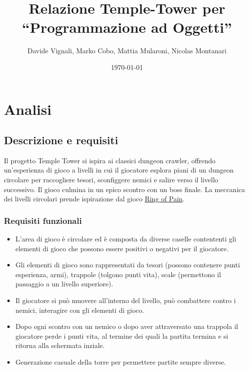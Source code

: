 \documentclass[a4paper,12pt]{report}
\title{Relazione Temple-Tower per\\``Programmazione ad Oggetti''}
\author{Davide Vignali, Marko Cobo, Mattia Mularoni, Nicolas Montanari}
\date{\today}
\begin{document}
\maketitle

\tableofcontents

\chapter{Analisi}

\section{Descrizione e requisiti}

Il progetto Temple Tower si ispira ai classici dungeon crawler, offrendo un’esperienza di gioco a livelli in cui il giocatore esplora piani di un dungeon circolare per raccogliere tesori, sconfiggere nemici e salire verso il livello successivo. Il gioco culmina in un epico scontro con un boss finale.
%
La meccanica dei livelli circolari prende ispirazione dal gioco \href{https://ring-of-pain.fandom.com/wiki/Ring_of_Pain_Wiki}{Ring of Pain}.


\subsection*{Requisiti funzionali}
\begin{itemize}
	\item L'area di gioco è circolare ed è composta da diverse caselle contententi gli elementi di gioco che possono essere positivi o negativi per il giocatore.
	\item Gli elementi di gioco sono rappresentati da tesori (possono contenere punti esperienza, armi), trappole (tolgono punti vita), scale (permettono il passaggio a un livello superiore).
	\item Il giocatore si può muovere all'interno del livello, può combattere contro i nemici,  interagire con gli elementi di gioco.
	\item Dopo ogni scontro con un nemico o dopo aver attraversato una trappola il giocatore perde i punti vita, al termine dei quali la partita termina e si ritorna alla schermata inziale.
    \item Generazione casuale della torre per permettere partite sempre diverse.
\end{itemize}
\end{document}
